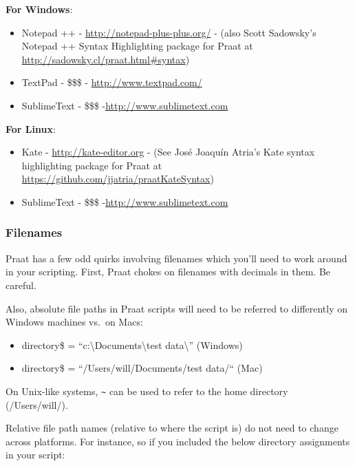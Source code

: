 \documentclass[11pt]{article}
\def\tightlist{}
\begin{document}
\textbf{For Windows}:

\begin{itemize}
\tightlist
\item
  Notepad ++ - \url{http://notepad-plus-plus.org/} - (also Scott
  Sadowsky's Notepad ++ Syntax Highlighting package for Praat at
  \url{http://sadowsky.cl/praat.html#syntax})
\item
  TextPad - \$\$\$ - \url{http://www.textpad.com/}
\item
  SublimeText - \$\$\$ -\url{http://www.sublimetext.com}
\end{itemize}

\textbf{For Linux}:

\begin{itemize}
\tightlist
\item
  Kate - \url{http://kate-editor.org} - (See José Joaquín Atria's Kate
  syntax highlighting package for Praat at
  \url{https://github.com/jjatria/praatKateSyntax})
\item
  SublimeText - \$\$\$ -\url{http://www.sublimetext.com}
\end{itemize}

\hypertarget{filenames}{%
\subsubsection{Filenames}\label{filenames}}

\label{filenames}

Praat has a few odd quirks involving filenames which you'll need to work
around in your scripting. First, Praat chokes on filenames with decimals
in them. Be careful.

Also, absolute file paths in Praat scripts will need to be referred to
differently on Windows machines vs.~on Macs:

\begin{itemize}
\tightlist
\item
  directory\$ = ``c:\textbackslash Documents\textbackslash test
  data\textbackslash'' (Windows)
\item
  directory\$ = ``/Users/will/Documents/test data/`` (Mac)
\end{itemize}

On Unix-like systems, \texttt{\~} can be used to refer to the home
directory (/Users/will/).

Relative file path names (relative to where the script is) do not need
to change across platforms. For instance, so if you included the below
directory assignments in your script:
\end{document}
